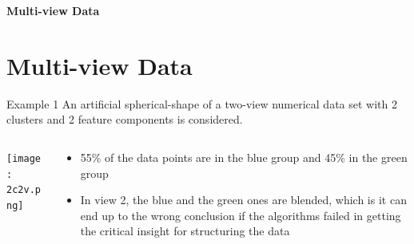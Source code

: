\documentclass[compress,sky blue]{beamer}
\begin{document}

\begin{frame}{}
    \centering
    \Huge{\textbf{Multi-view Data}}
\end{frame}


\section{Multi-view Data }




\begin{frame}{Example 1}
An artificial spherical-shape of a two-view numerical data set with 2 clusters and 2 feature components is considered. 
\begin{columns}
  \begin{column}{0.3\textwidth}
    \begin{center}
     \texttt{[image: 2c2v.png]}
     \end{center}
  \end{column}
  \begin{column}{0.7\textwidth}  %
    \begin{itemize}
	  \item 55\% of the data points are in the blue group and 45\% in the green group
\item In view 2, the blue and the green ones are blended, which is it can end up to the wrong conclusion if the algorithms failed in getting the critical insight for structuring the data
	\end{itemize}
  \end{column}
\end{columns}


\end{frame}
\end{document}
